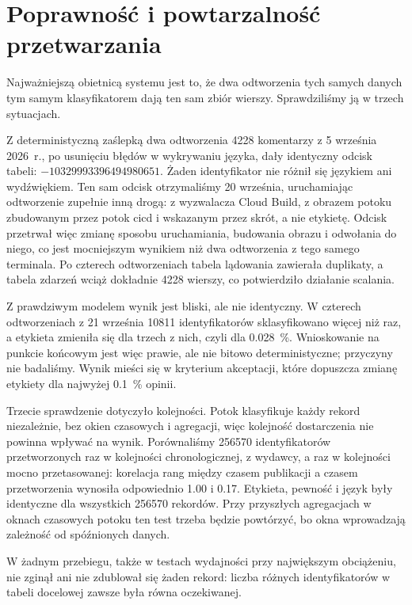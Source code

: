 \section{Poprawność i powtarzalność przetwarzania}
\label{sec:eval-reproducibility}

Najważniejszą obietnicą systemu jest to, że dwa odtworzenia tych samych danych tym samym klasyfikatorem dają ten sam zbiór wierszy.
Sprawdziliśmy ją w trzech sytuacjach.

Z deterministyczną zaślepką dwa odtworzenia \num{4228} komentarzy z 5 września 2026~r., po usunięciu błędów w wykrywaniu języka, dały identyczny odcisk tabeli: $-\num{10329993396494980651}$.
Żaden identyfikator nie różnił się językiem ani wydźwiękiem.
Ten sam odcisk otrzymaliśmy 20 września, uruchamiając odtworzenie zupełnie inną drogą: z wyzwalacza Cloud Build, z obrazem potoku zbudowanym przez potok \ac{cicd} i wskazanym przez skrót, a nie etykietę.
Odcisk przetrwał więc zmianę sposobu uruchamiania, budowania obrazu i odwołania do niego, co jest mocniejszym wynikiem niż dwa odtworzenia z tego samego terminala.
Po czterech odtworzeniach tabela lądowania zawierała duplikaty, a tabela zdarzeń wciąż dokładnie \num{4228} wierszy, co potwierdziło działanie scalania.

Z prawdziwym modelem wynik jest bliski, ale nie identyczny.
W czterech odtworzeniach z 21 września \num{10811} identyfikatorów sklasyfikowano więcej niż raz, a etykieta zmieniła się dla trzech z nich, czyli dla \qty{0.028}{\percent}.
Wnioskowanie na punkcie końcowym jest więc prawie, ale nie bitowo deterministyczne; przyczyny nie badaliśmy.
Wynik mieści się w kryterium akceptacji, które dopuszcza zmianę etykiety dla najwyżej \qty{0.1}{\percent} opinii.

Trzecie sprawdzenie dotyczyło kolejności.
Potok klasyfikuje każdy rekord niezależnie, bez okien czasowych i agregacji, więc kolejność dostarczenia nie powinna wpływać na wynik.
Porównaliśmy \num{256570} identyfikatorów przetworzonych raz w kolejności chronologicznej, z wydawcy, a raz w kolejności mocno przetasowanej: korelacja rang między czasem publikacji a czasem przetworzenia wynosiła odpowiednio \num{1.00} i \num{0.17}.
Etykieta, pewność i język były identyczne dla wszystkich \num{256570} rekordów.
Przy przyszłych agregacjach w oknach czasowych potoku ten test trzeba będzie powtórzyć, bo okna wprowadzają zależność od spóźnionych danych.

W żadnym przebiegu, także w testach wydajności przy największym obciążeniu, nie zginął ani nie zdublował się żaden rekord: liczba różnych identyfikatorów w tabeli docelowej zawsze była równa oczekiwanej.

